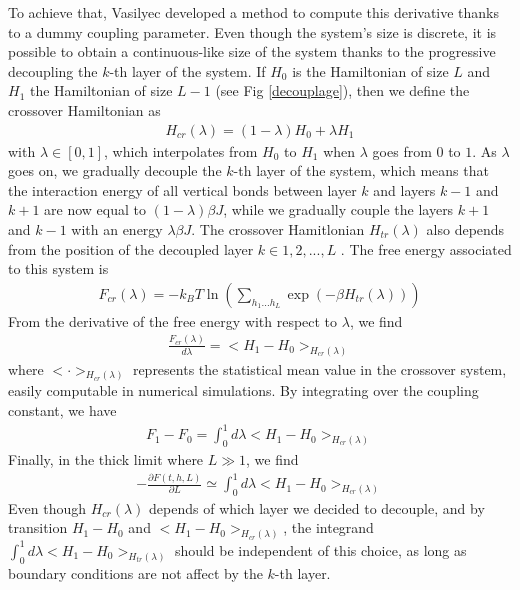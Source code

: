 To achieve that, Vasilyec \cite{vasilyev_universal_2009} developed a method to compute this derivative thanks to a dummy coupling parameter. Even though the system's size is discrete, it is possible to obtain a continuous-like size of the system thanks to the progressive decoupling the $k$-th layer of the system. If $H_0$ is the Hamiltonian of size $L$ and $H_1$ the Hamiltonian of size $L-1$ (see Fig \ref{decouplage}), then we define the crossover Hamiltonian as
\begin{align}
H_{cr}(\lambda) = (1-\lambda) H_0 + \lambda H_1
\label{hamil-trans}
\end{align}
with $\lambda \in [0,1]$, which interpolates from $H_0$ to $H_1$ when $\lambda$ goes from $0$ to $1$. As $\lambda$ goes on, we gradually decouple the $k$-th layer of the system, which means that the interaction energy of all vertical bonds between layer $k$ and layers $k-1$ and $k+1$ are now equal to $(1-\lambda)\beta J$, while we gradually couple the layers $k+1$ and $k-1$ with an energy $\lambda \beta J$.
The crossover Hamitlonian $H_{tr}(\lambda)$ also depends from the position of the decoupled layer $k \in {1,2,...,L}$ . The free energy associated to this system is
\begin{align}
F_{cr}(\lambda) = -k_B T \ln \left( \sum_{h_1 ... h_L} \exp(-\beta H_{tr}(\lambda)) \right)
\end{align}
From the derivative of the free energy with respect to $\lambda$, we find
\begin{align}
\frac{F_{cr}(\lambda)}{d\lambda} = < H_1 - H_0>_{H_{cr}(\lambda)}
\end{align}
where $< \cdot >_{H_{cr}(\lambda)}$ represents the statistical mean value in the crossover system, easily computable in numerical simulations. By integrating over the coupling constant, we have
\begin{align}
F_1 - F_0 = \int_0^1 d\lambda < H_1 - H_0>_{H_{cr}(\lambda)}
\end{align}
Finally, in the thick limit where $L\gg1$, we find
\begin{align}
- \frac{\partial F(t,h,L)}{\partial L} \simeq \int_0^1 d\lambda < H_1 - H_0>_{H_{cr}(\lambda)}
\end{align}
Even though $H_{cr}(\lambda)$ depends of which layer we decided to decouple, and by transition $H_1-H_0$ and $< H_1 - H_0>_{H_{cr}(\lambda)}$, the integrand $\int_0^1 d\lambda < H_1 - H_0>_{H_{tr}(\lambda)}$ should be independent of this choice, as long as boundary conditions are not affect by the $k$-th layer.

